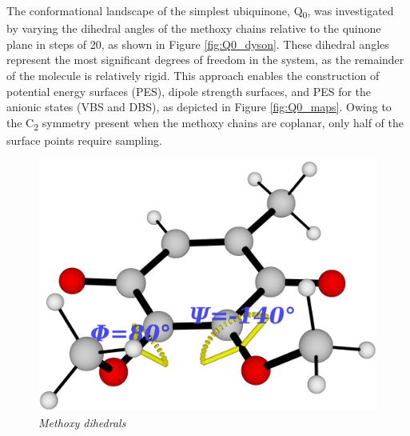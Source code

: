 The conformational landscape of the simplest ubiquinone, Q\textsubscript{0}, was investigated by varying the dihedral angles of the methoxy chains relative to the quinone plane in steps of 20\degree, as shown in Figure \ref{fig:Q0_dyson}. These dihedral angles represent the most significant degrees of freedom in the system, as the remainder of the molecule is relatively rigid. This approach enables the construction of potential energy surfaces (PES), dipole strength surfaces, and PES for the anionic states (VBS and DBS), as depicted in Figure \ref{fig:Q0_maps}. Owing to the C\textsubscript{2} symmetry present when the methoxy chains are coplanar, only half of the surface points require sampling.\\
\begin{figure}[b!]
  \centering
  \begin{minipage}[b]{0.30\textwidth}
    \centering
    \includegraphics[width=1.15\textwidth]{chapters/results/image/dihedrals.png}
    \vspace{15pt}
    \small\emph{Methoxy dihedrals}
  \end{minipage}
  \hfill
  \begin{minipage}[b]{0.30\textwidth}
    \centering

\end{minipage}
\end{figure}
